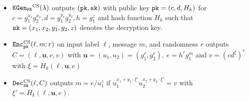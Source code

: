 \begin{itemize}
  \item $\mathtt{KGen_{PK}}^\mathrm{CS}(\lambda)$ outputs $(\mathtt{pk}, \mathtt{sk})$ with public key $\mathtt{pk}=(c,d,H_k)$ for $c=g_{1}^{x_1}g_{2}^{x_2}, d=g_{1}^{y_1}g_{2}^{y_2}, h=g_{1}^z$ and hash function $H_k$ such that $\mathtt{sk}=(x_1,x_2,y_1,y_2,z)$ denotes the decryption key.
  \item $\mathtt{Enc}^{\mathrm{CS}}_\mathtt{pk}(\ell,m;r)$ on input label $\ell$, message $m$, and randomness $r$ outputs $C=(\ell,\bm{u},e,v)$ with $\bm{u}=(u_1,u_2)=(g_{1}^r,g_{2}^r),~ e=h^rg_1^m$ and $v=(cd^{\xi})^r$ with $\xi=H_k(\ell,\bm{u},e)$
  \item $\mathtt{Dec}_\mathtt{sk}^\mathrm{CS}(\ell,C)$ outputs $m=e/u_1^z$ if $u_1^{x_1+y_1\cdot \xi'}u_2^{x_2+y_2\cdot \xi'}=v$ with $\xi'=H_k(\ell,\bm{u},e)$.
\end{itemize}

